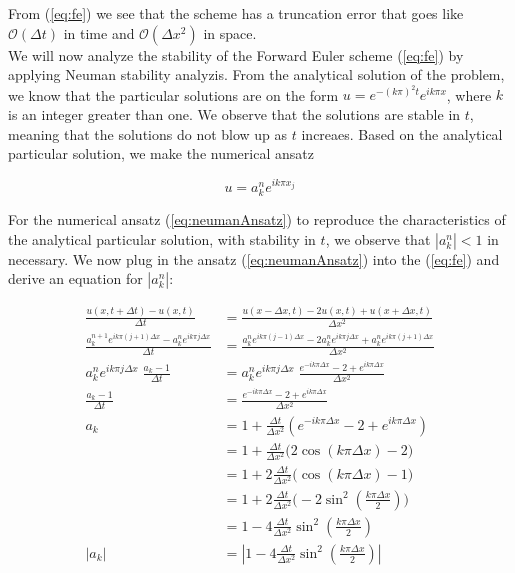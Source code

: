 \documentclass{article}
\begin{document}
From (\ref{eq:fe}) we see that the scheme has a truncation error that goes like $\mathcal{O} (\Delta t)$ in time and $\mathcal{O}(\Delta x^2)$ in space.\\

We will now analyze the stability of the Forward Euler scheme (\ref{eq:fe}) by applying Neuman stability analyzis. From the analytical solution of the problem, we know that the particular solutions are on the form $u = e^{-(k \pi)^2 t}e^{i k \pi x}$, where $k$ is an integer greater than one. We observe that the solutions are stable in $t$, meaning that the solutions do not blow up as $t$ increaes. Based on the analytical particular solution, we make the numerical ansatz 

\begin{equation}\label{eq:neumanAnsatz}
	u = a_k^n e^{i k \pi x_j}
\end{equation}

For the numerical ansatz (\ref{eq:neumanAnsatz}) to reproduce the characteristics of the analytical particular solution, with stability in $t$, we observe that $|a_k^n| < 1$ in necessary. We now plug in the ansatz (\ref{eq:neumanAnsatz}) into the (\ref{eq:fe}) and derive an equation for $|a_k^n|$:

\begin{subequations}\label{eq:naumanFe0}
	\begin{align}
		\frac{u(x, t+ \Delta t) - u(x,t)}{\Delta t}  &= 
		\frac{u(x - \Delta x, t) - 2u(x,t) + u(x+ \Delta x, t)}{\Delta x^2} \\
		\frac{a_k^{n+1} e^{i k \pi (j+1) \Delta x} - a_k^n e^{i k \pi j \Delta x}}{\Delta t}  &= 
		\frac{a_k^{n} e^{i k \pi (j-1) \Delta x} - 2a_k^{n} e^{i k \pi j \Delta x} + a_k^{n} e^{i k \pi (j+1) \Delta x}}{\Delta x^2} \\
		a_k^{n} e^{i k \pi j \Delta x}\; \frac{a_k  -1}{\Delta t}  &= 
		a_k^{n} e^{i k \pi j \Delta x}\; \frac{ e^{-i k \pi \Delta x} - 2  +  e^{i k \pi  \Delta x}}{\Delta x^2} \\
		 \frac{a_k  -1}{\Delta t}  &= 
		 \frac{ e^{-i k \pi \Delta x} - 2  +  e^{i k \pi  \Delta x}}{\Delta x^2} \\
		 a_k &= 1 + \frac{\Delta t}{\Delta x^2} (e^{-i k \pi \Delta x} - 2  +  e^{i k \pi  \Delta x})\\
		 &= 1+ \frac{\Delta t}{\Delta x^2} \Big(2 \cos(k\pi\Delta x) - 2\Big)\\
		 &= 1+ 2\frac{\Delta t}{\Delta x^2} \Big( \cos(k\pi\Delta x) - 1\Big)\\
		 &= 1+ 2\frac{\Delta t}{\Delta x^2} \Big(- 2 \sin^2(\frac{k\pi\Delta x}{2}) \Big)\\
		 &=1 - 4\frac{\Delta t}{\Delta x^2} \sin^2(\frac{k\pi\Delta x}{2}) \\
		 |a_k| &= |1 - 4\frac{\Delta t}{\Delta x^2} \sin^2(\frac{k\pi\Delta x}{2})|\label{eq:neumanFe1}
	\end{align}
\end{subequations}
\end{document}
